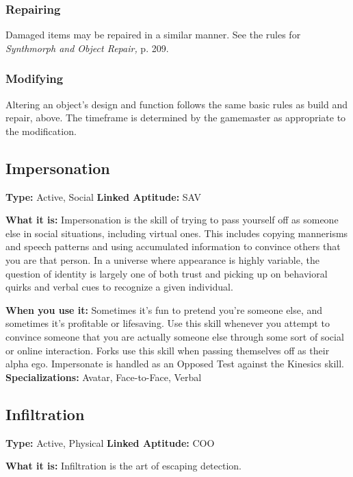 \subsubsection{Repairing}

Damaged items may be repaired in a similar manner. See 
the rules for \textit{Synthmorph and Object Repair,} p. 209.

\subsubsection{Modifying}

Altering an object's design and function follows the 
same basic rules as build and repair, above. The timeframe
is determined by the gamemaster as appropriate
to the modification.

\subsection{Impersonation}

\textbf{Type:} Active, Social
\textbf{Linked Aptitude:} SAV

\textbf{What it is:} Impersonation is the skill of trying to 
pass yourself off as someone else in social situations, 
including virtual ones. This includes copying mannerisms
and speech patterns and using accumulated information
to convince others that you are that person.
In a universe where appearance is highly variable, the 
question of identity is largely one of both trust and 
picking up on behavioral quirks and verbal cues to 
recognize a given individual.

\textbf{When you use it:} Sometimes it's fun to pretend 
you're someone else, and sometimes it's profitable 
or lifesaving. Use this skill whenever you attempt 
to convince someone that you are actually someone 
else through some sort of social or online interaction. 
Forks use this skill when passing themselves off as 
their alpha ego. Impersonate is handled as an Opposed
Test against the Kinesics skill.
\textbf{Specializations:} Avatar, Face-to-Face, Verbal

\subsection{Infiltration}

\textbf{Type:} Active, Physical
\textbf{Linked Aptitude:} COO

\textbf{What it is:} Infiltration is the art of escaping 
detection.

